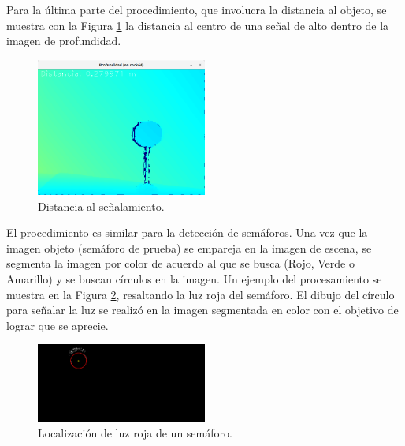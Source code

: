 \par Para la última parte del procedimiento, que involucra la distancia al objeto, se muestra con la Figura \ref{fig:dist} la distancia al centro de una señal de alto dentro de la imagen de profundidad.
\begin{figure}[htbp!]
	\centering
	\includegraphics[width=0.5\textwidth]{./Figuras/Distancia}
	\caption{Distancia al señalamiento.}
	\label{fig:dist}
\end{figure}
\par El procedimiento es similar para la detección de semáforos. Una vez que la imagen objeto (semáforo de prueba) se empareja en la imagen de escena, se segmenta la imagen por color de acuerdo al que se busca (Rojo, Verde o Amarillo) y se buscan círculos en la imagen. Un ejemplo del procesamiento se muestra en la Figura \ref{fig:sema}, resaltando la luz roja del semáforo. El dibujo del círculo para señalar la luz se realizó en la imagen segmentada en color con el objetivo de lograr que se aprecie.
\begin{figure}[htbp!]
	\centering
	\includegraphics[width=0.5\textwidth]{./Figuras/Sema}
	\caption{Localización de luz roja de un semáforo.}
	\label{fig:sema}
\end{figure}
